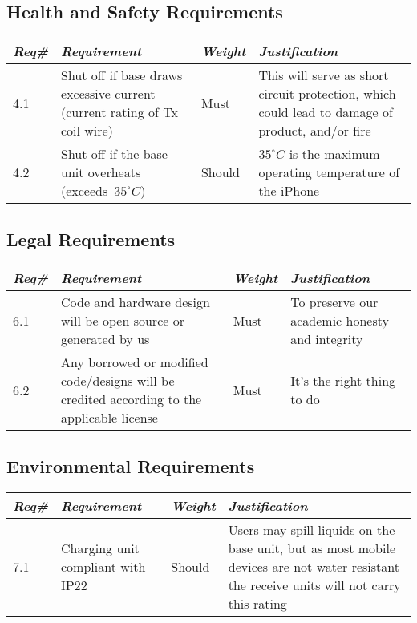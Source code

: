     \subsection{Health and Safety Requirements}
        \begin{centering}
        \begin{tabular}{|l|m{7cm}|l|m{7cm}|} \hline
        \textit{\textbf{Req\#}}	& \textit{\textbf{Requirement}} &\textit{\textbf{Weight}}&\textit{\textbf{Justification}} \\ \hline
        4.1	& Shut off if base draws excessive current (current rating of Tx coil wire)	& Must &This will serve as short circuit protection, which could lead to damage of product, and/or fire \\ \hline
        4.2	& Shut off if the base unit overheats \mbox{(exceeds $35^{\circ}C$)}& Should & $35^{\circ}C$ is the maximum operating temperature of the iPhone \\ \hline
        \end{tabular}
        \end{centering}
    
    \subsection{Legal Requirements}
        \begin{centering}
        \begin{tabular}{|l|m{7cm}|l|m{7cm}|} \hline
        \textit{\textbf{Req\#}}	& \textit{\textbf{Requirement}} &\textit{\textbf{Weight}}&\textit{\textbf{Justification}} \\ \hline
        6.1	& Code and hardware design will be open source or generated by us& Must	&To preserve our academic honesty and integrity \\ \hline
        6.2	& Any borrowed or modified code/designs will be credited according to the applicable license & Must	&It's the right thing to do\\ \hline
        \end{tabular}
        \end{centering}
    
    \subsection{Environmental Requirements}
        \begin{centering}
        \begin{tabular}{|l|m{7cm}|l|m{7cm}|} \hline
        \textit{\textbf{Req\#}}	& \textit{\textbf{Requirement}} &\textit{\textbf{Weight}}&\textit{\textbf{Justification}} \\ \hline
        7.1	& Charging unit compliant with IP22	& Should & Users may spill liquids on the base unit, but as most mobile devices are not water resistant the receive units will not carry this rating \\ \hline
        \end{tabular}
        \end{centering}
    
